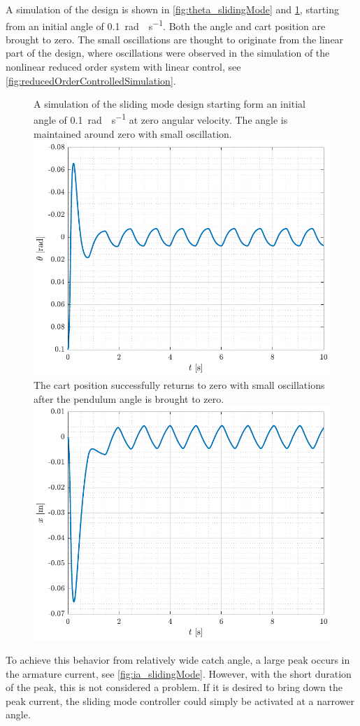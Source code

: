 A simulation of the design is shown in \autoref{fig:theta_slidingMode} and \ref{fig:x_slidingMode}, starting from an initial angle of \SI{0.1}{rad \cdot s^{-1}}. Both the angle and cart position are brought to zero. The small oscillations are thought to originate from the linear part of the design, where oscillations were observed in the simulation of the nonlinear reduced order system with linear control, see \autoref{fig:reducedOrderControlledSimulation}.
%
\begin{figure}[H]
  \hspace{-10pt}
  \captionbox
  {
    A simulation of the sliding mode design starting form an initial angle of \SI{0.1}{rad \cdot s^{-1}} at zero angular velocity. The angle is maintained around zero with small oscillation.
    \label{fig:theta_slidingMode}
  }
  {
    \hspace{-1cm}
    \includegraphics[width=.4\textwidth]{figures/theta_slidingMode}
  }
  \hspace{20pt}
  \captionbox 
  {
    The cart position successfully returns to zero with small oscillations after the pendulum angle is brought to zero.
    \label{fig:x_slidingMode}
  }
  {
    \hspace{-1cm}
    \includegraphics[width=.4\textwidth]{figures/x_slidingMode}
  }  
\end{figure}
%
To achieve this behavior from relatively wide catch angle, a large peak occurs in the armature current, see \autoref{fig:ia_slidingMode}. However, with the short duration of the peak, this is not considered a problem. If it is desired to bring down the peak current, the sliding mode controller could simply be activated at a narrower angle.
